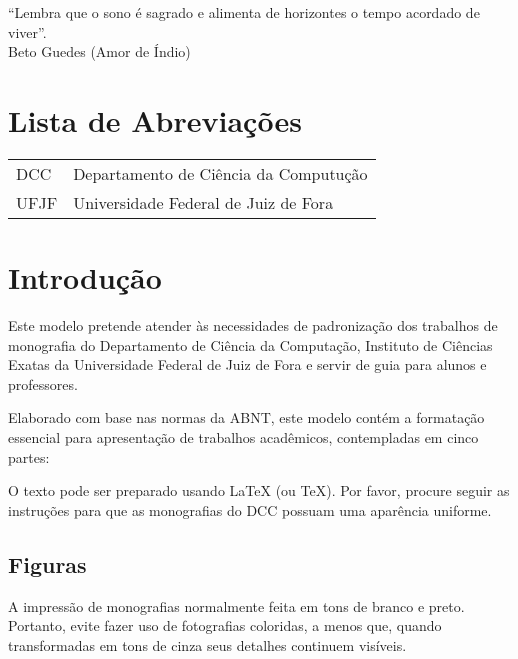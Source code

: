 \documentclass[a4paper,12pt]{monografia}
\theoremstyle{plain}
\theoremstyle{definition}
\theoremstyle{remark}
\begin{document}
\begin{epigrafe}
``Lembra que o sono é sagrado e alimenta de horizontes o tempo acordado de viver''.\\
\hfill Beto Guedes (Amor de Índio)
\end{epigrafe}



 \tableofcontents \thispagestyle{empty} \listoffigures
\thispagestyle{empty} \listoftables \thispagestyle{empty}



\chapter*{Lista de Abreviações} 
\doublespacing  \begin{tabular}{l l}

DCC & Departamento de Ciência da Computução \\
UFJF & Universidade Federal de Juiz de Fora \\



\end{tabular}  \thispagestyle{empty}




%
%
%
\pagestyle{ruledheader}
\chapter{Introdução}
Este modelo pretende atender às necessidades de padronização dos trabalhos de monografia do Departamento de Ciência da Computação, Instituto de Ciências Exatas da Universidade Federal de Juiz de Fora e servir de guia para alunos e professores.
 
Elaborado com base nas normas da ABNT, este modelo contém a formatação essencial para apresentação de trabalhos acadêmicos, contempladas em  cinco partes:

O texto pode ser preparado usando LaTeX (ou TeX). Por favor, procure seguir as instruções para que as monografias do DCC possuam uma aparência uniforme.

\section{Figuras}
A impressão de monografias normalmente feita em tons de branco e preto. Portanto, evite fazer uso de fotografias coloridas, a menos que, quando transformadas em tons de cinza seus detalhes continuem visíveis.
\end{document}
